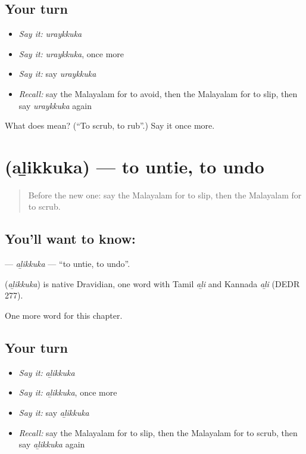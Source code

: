 \subsection*{Your turn}
\begin{itemize}
\raggedright
  \item \emph{Say it:} \emph{uraykkuka}
  \item \emph{Say it:} \emph{uraykkuka}, once more
  \item \emph{Say it:} say \emph{uraykkuka}
  \item \emph{Recall:} say the Malayalam for to avoid, then the Malayalam for to slip, then say \emph{uraykkuka} again
\end{itemize}

\begin{tcolorbox}[breakable,colback=teal!4,colframe=teal!35!black,title={Before you move on}]
What does  mean? (\textquotedblleft{}To scrub, to rub\textquotedblright{}.) Say it once more.
\end{tcolorbox}
\section[\texorpdfstring{\ml{അഴിക്കുക} (aḻikkuka)}{അഴിക്കുക (aḻikkuka)}]{ (aḻikkuka) — to untie, to undo}

\label{lesson:ML-C310-alikkuka}



\begin{quote}
Before the new one: say the Malayalam for to slip, then the Malayalam for to scrub.
\end{quote}

\subsection*{You'll want to know: }
\textbf{} — \emph{aḻikkuka} — \textquotedblleft{}to untie, to undo\textquotedblright{}.

\begin{cousinweb}
\textbf{} (\emph{aḻikkuka}) is native Dravidian, one word with Tamil \emph{aḻi} and Kannada \emph{aḻi} (DEDR 277).
\end{cousinweb}

\begin{grammarlens}[title={What you've built}]
One more word for this chapter.
\end{grammarlens}

\subsection*{Your turn}
\begin{itemize}
\raggedright
  \item \emph{Say it:} \emph{aḻikkuka}
  \item \emph{Say it:} \emph{aḻikkuka}, once more
  \item \emph{Say it:} say \emph{aḻikkuka}
  \item \emph{Recall:} say the Malayalam for to slip, then the Malayalam for to scrub, then say \emph{aḻikkuka} again
\end{itemize}

